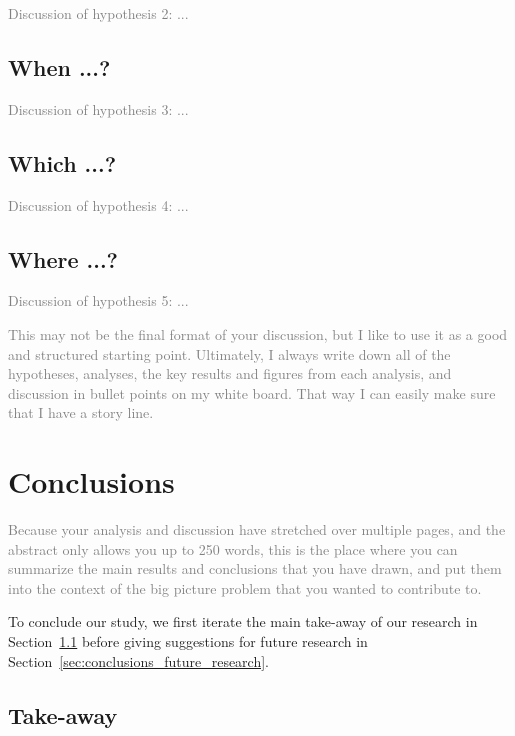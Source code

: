 \documentclass[
  journal=pasa,
  manuscript=Research-Article,
  year=2025,
  volume=X,
]{cup-journal}
\newcommand{\comment}[1]{\textcolor{gray}{#1}}
\begin{document}
\comment{Discussion of hypothesis 2: ...}

\subsection{When ...?} \label{sec:discussion_hypothesis3}

\comment{Discussion of hypothesis 3: ...}

\subsection{Which ...?} \label{sec:discussion_hypothesis4}

\comment{Discussion of hypothesis 4: ...}

\subsection{Where ...?} \label{sec:discussion_hypothesis5}

\comment{Discussion of hypothesis 5: ...}


\comment{This may not be the final format of your discussion, but I like to use it as a good and structured starting point. Ultimately, I always write down all of the hypotheses, analyses, the key results and figures from each analysis, and discussion in bullet points on my white board. That way I can easily make sure that I have a story line.}

\clearpage
\section{Conclusions} \label{sec:conclusions}

\comment{Because your analysis and discussion have stretched over multiple pages, and the abstract only allows you up to 250 words, this is the place where you can summarize the main results and conclusions that you have drawn, and put them into the context of the big picture problem that you wanted to contribute to.}

To conclude our study, we first iterate the main take-away of our research in Section~\ref{sec:conclusions_takeaway} before giving suggestions for future research in Section~\ref{sec:conclusions_future_research}.

\subsection{Take-away} \label{sec:conclusions_takeaway}
\end{document}
